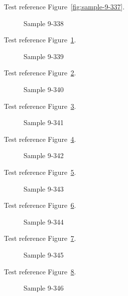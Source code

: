 Test reference Figure~\ref{fig:sample-9-337}.

\begin{figure}[tbhp]
\caption{Sample 9-338}
\label{fig:sample-9-338}
\end{figure}

Test reference Figure~\ref{fig:sample-9-338}.

\begin{figure}[tbhp]
\caption{Sample 9-339}
\label{fig:sample-9-339}
\end{figure}

Test reference Figure~\ref{fig:sample-9-339}.

\begin{figure}[tbhp]
\caption{Sample 9-340}
\label{fig:sample-9-340}
\end{figure}

Test reference Figure~\ref{fig:sample-9-340}.

\begin{figure}[tbhp]
\caption{Sample 9-341}
\label{fig:sample-9-341}
\end{figure}

Test reference Figure~\ref{fig:sample-9-341}.

\begin{figure}[tbhp]
\caption{Sample 9-342}
\label{fig:sample-9-342}
\end{figure}

Test reference Figure~\ref{fig:sample-9-342}.

\begin{figure}[tbhp]
\caption{Sample 9-343}
\label{fig:sample-9-343}
\end{figure}

Test reference Figure~\ref{fig:sample-9-343}.

\begin{figure}[tbhp]
\caption{Sample 9-344}
\label{fig:sample-9-344}
\end{figure}

Test reference Figure~\ref{fig:sample-9-344}.

\begin{figure}[tbhp]
\caption{Sample 9-345}
\label{fig:sample-9-345}
\end{figure}

Test reference Figure~\ref{fig:sample-9-345}.

\begin{figure}[tbhp]
\caption{Sample 9-346}
\label{fig:sample-9-346}
\end{figure}

